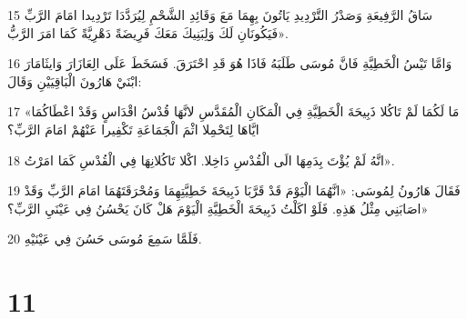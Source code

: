 \par 15 سَاقُ الرَّفِيعَةِ وَصَدْرُ التَّرْدِيدِ يَاتُونَ بِهِمَا مَعَ وَقَائِدِ الشَّحْمِ لِيُرَدَّدَا تَرْدِيدا امَامَ الرَّبِّ فَيَكُونَانِ لَكَ وَلِبَنِيكَ مَعَكَ فَرِيضَةً دَهْرِيَّةً كَمَا امَرَ الرَّبُّ».
\par 16 وَامَّا تَيْسُ الْخَطِيَّةِ فَانَّ مُوسَى طَلَبَهُ فَاذَا هُوَ قَدِ احْتَرَقَ. فَسَخَطَ عَلَى الِعَازَارَ وَايثَامَارَ ابْنَيْ هَارُونَ الْبَاقِيَيْنِ وَقَالَ:
\par 17 «مَا لَكُمَا لَمْ تَاكُلا ذَبِيحَةَ الْخَطِيَّةِ فِي الْمَكَانِ الْمُقَدَّسِ لانَّهَا قُدْسُ اقْدَاسٍ وَقَدْ اعْطَاكُمَا ايَّاهَا لِتَحْمِلا اثْمَ الْجَمَاعَةِ تَكْفِيرا عَنْهُمْ امَامَ الرَّبِّ؟
\par 18 انَّهُ لَمْ يُؤْتَ بِدَمِهَا الَى الْقُدْسِ دَاخِلا. اكْلا تَاكُلانِهَا فِي الْقُدْسِ كَمَا امَرْتُ».
\par 19 فَقَالَ هَارُونُ لِمُوسَى: «انَّهُمَا الْيَوْمَ قَدْ قَرَّبَا ذَبِيحَةَ خَطِيَّتِهِمَا وَمُحْرَقَتَهُمَا امَامَ الرَّبِّ وَقَدْ اصَابَنِي مِثْلُ هَذِهِ. فَلَوْ اكَلْتُ ذَبِيحَةَ الْخَطِيَّةِ الْيَوْمَ هَلْ كَانَ يَحْسُنُ فِي عَيْنَيِ الرَّبِّ؟»
\par 20 فَلَمَّا سَمِعَ مُوسَى حَسُنَ فِي عَيْنَيْهِ.

\chapter{11}

